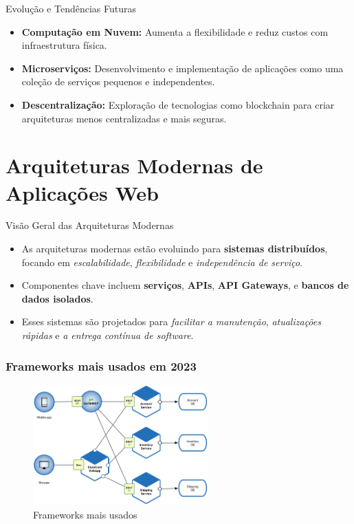 \begin{frame}{Evolução e Tendências Futuras}
  \begin{itemize}
    \item \textbf{Computação em Nuvem:} Aumenta a flexibilidade e reduz custos com infraestrutura física.
    \item \textbf{Microserviços:} Desenvolvimento e implementação de aplicações como uma coleção de serviços pequenos e independentes.
    \item \textbf{Descentralização:} Exploração de tecnologias como blockchain para criar arquiteturas menos centralizadas e mais seguras.
  \end{itemize}
\end{frame}

\section{Arquiteturas Modernas de Aplicações Web}

\begin{frame}{Visão Geral das Arquiteturas Modernas}
  \begin{itemize}
    \item As arquiteturas modernas estão evoluindo para \textbf{sistemas distribuídos}, focando em \textit{escalabilidade}, \textit{flexibilidade} e \textit{independência de serviço}.
    \item Componentes chave incluem \textbf{serviços}, \textbf{APIs}, \textbf{API Gateways}, e \textbf{bancos de dados isolados}.
    \item Esses sistemas são projetados para \textit{facilitar a manutenção}, \textit{atualizações rápidas} e \textit{a entrega contínua de software}.
  \end{itemize}
\end{frame}

\begin{frame}[fragile]
  \frametitle{Frameworks mais usados em 2023}
  \begin{figure}
    \centering
    \includegraphics[width=0.6\textwidth]{assets/architecture.png}
    \caption{Frameworks mais usados}
  \end{figure}
\end{frame}

